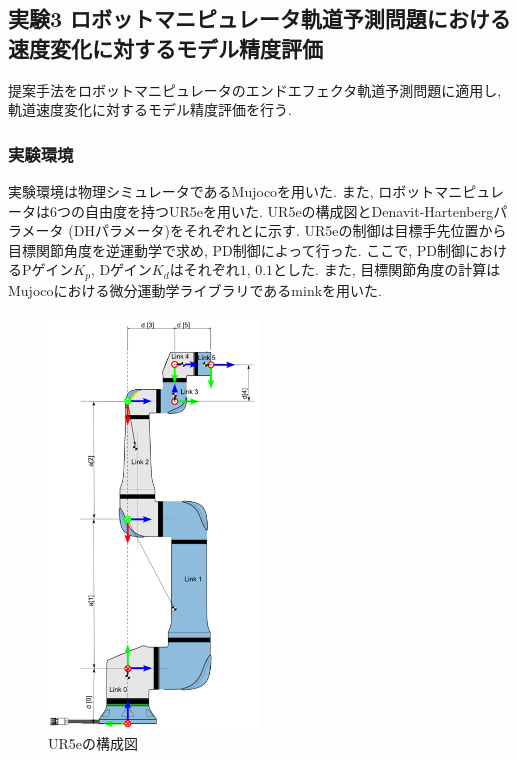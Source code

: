 \subsection{実験3 ロボットマニピュレータ軌道予測問題における速度変化に対するモデル精度評価}
提案手法をロボットマニピュレータのエンドエフェクタ軌道予測問題に適用し, 軌道速度変化に対するモデル精度評価を行う.

\subsubsection{実験環境}
実験環境は物理シミュレータであるMujoco\cite{mujoco}を用いた.
また, ロボットマニピュレータは6つの自由度を持つUR5eを用いた.
UR5eの構成図とDenavit-Hartenbergパラメータ (DHパラメータ)をそれぞれとに示す.
UR5eの制御は目標手先位置から目標関節角度を逆運動学で求め, PD制御によって行った.
ここで, PD制御におけるPゲイン$K_p$, Dゲイン$K_d$はそれぞれ$1$, $0.1$とした.
また, 目標関節角度の計算はMujocoにおける微分運動学ライブラリであるmink\cite{mink}を用いた.
\begin{figure}[htb]
    \centering
    \includegraphics[width=0.5\textwidth]{Static/ur5e_structure.png}
    \caption[UR5eの構成図]{
        UR5eの構成図\cite{ur5e}
    }
    \label{fig:ur5e:structure}
\end{figure}

